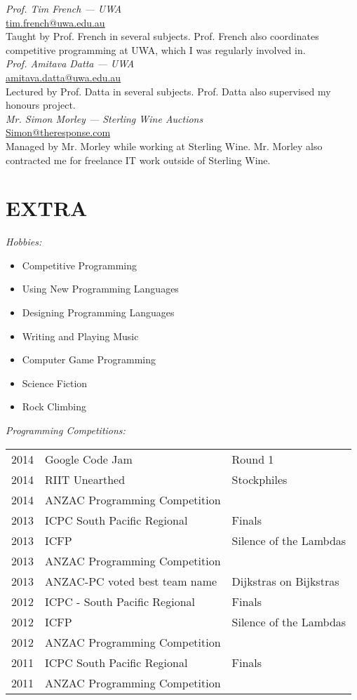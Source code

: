 \documentclass[margin, 10pt]{res} %
\begin{document}
\begin{resume}
{\sl Prof. Tim French --- UWA } \\
\url{tim.french@uwa.edu.au}\\
Taught by Prof. French in several subjects. Prof. French also coordinates competitive programming at UWA, which I was regularly involved in. \\


{\sl Prof. Amitava Datta --- UWA } \\
\url{amitava.datta@uwa.edu.au}\\
Lectured by Prof. Datta in several subjects. Prof. Datta also supervised my honours project.\\


{\sl Mr. Simon Morley --- Sterling Wine Auctions } \\
\url{Simon@theresponse.com} \\
Managed by Mr. Morley while working at Sterling Wine. Mr. Morley also contracted me for freelance IT work outside of Sterling Wine. \\

\section{EXTRA}
{\sl Hobbies: } \\
\begin{itemize}
\item Competitive Programming
\item Using New Programming Languages
\item Designing Programming Languages
\item Writing and Playing Music
\item Computer Game Programming
\item Science Fiction
\item Rock Climbing
\end{itemize}



{\sl Programming Competitions: } \\
\begin{tabular}{rll}
2014 & Google Code Jam & Round 1 \\
2014 & RIIT Unearthed & Stockphiles   \\
2014 & ANZAC Programming Competition & \\
2013 & ICPC South Pacific Regional & Finals \\
2013 & ICFP & Silence of the Lambdas  \\
2013 & ANZAC Programming Competition & \\
2013 & ANZAC-PC voted best team name & Dijkstras on Bijkstras  \\
2012 & ICPC - South Pacific Regional & Finals \\
2012 & ICFP & Silence of the Lambdas  \\
2012 & ANZAC Programming Competition & \\
2011 & ICPC South Pacific Regional & Finals \\
2011 & ANZAC Programming Competition & \\
\end{tabular}

\end{resume}
\end{document}
